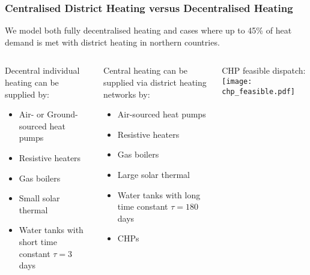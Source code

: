 \documentclass[10pt,aspectratio=169,dvipsnames]{beamer}
\let\olditem\item
\renewcommand{\item}{%
\olditem\vspace{5pt}}
\begin{document}
\begin{frame}
  \frametitle{Centralised District Heating versus Decentralised Heating}

  We model both fully decentralised heating and cases where up to 45\%
  of heat demand is met with district heating in northern countries.

\begin{columns}[T]
\begin{column}{5cm}
  \alert{Decentral individual heating} can be supplied by:
  \begin{itemize}
    \item Air- or Ground-sourced heat pumps
  \item Resistive heaters
  \item Gas boilers
    \item Small solar thermal
  \item Water tanks with short time constant $\tau = 3$ days
  \end{itemize}
\end{column}
\begin{column}{5cm}
  \alert{Central heating} can be supplied via district heating networks by:
  \begin{itemize}
    \item Air-sourced heat pumps
\item Resistive heaters
\item Gas boilers
        \item Large solar thermal
  \item Water tanks with long time constant $\tau = 180$ days
\item CHPs
  \end{itemize}
\end{column}

\begin{column}{5cm}
  CHP feasible dispatch:
    \texttt{[image: chp\_feasible.pdf]}
\end{column}

\end{columns}


\end{frame}
\end{document}

